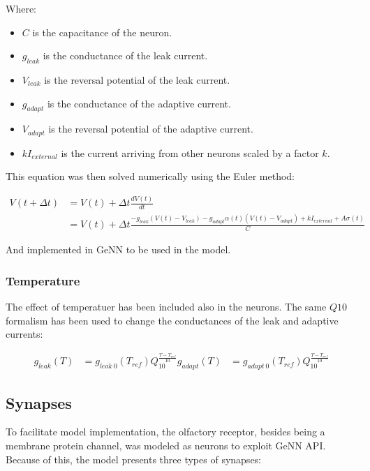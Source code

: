   Where:

  \begin{multicols}{2}
    \begin{itemize}
      \item $C$ is the capacitance of the neuron.
      \item $g_{leak}$ is the conductance of the leak current.
      \item $V_{leak}$ is the reversal potential of the leak current.
      \item $g_{adapt}$ is the conductance of the adaptive current.
      \item $V_{adapt}$ is the reversal potential of the adaptive current.
      \item $k I_{external}$ is the current arriving from other neurons scaled by a factor $k$.
    \end{itemize}
  \end{multicols}

  This equation was then solved numerically using the Euler method:

  \begin{align}
    V(t + \Delta t) &= V(t) + \Delta t\frac{dV(t)}{dt}\\
                    &= V(t) + \Delta t\frac{-g_{leak}(V(t)-V_{leak}) - g_{adapt}\alpha(t)(V(t) - V_{adapt}) + k I_{external} + A\sigma(t)}{C}
  \end{align}

  And implemented in GeNN to be used in the model.

    \subsubsection{Temperature}
    The effect of temperatuer has been included also in the neurons.
    The same $Q10$ formalism has been used to change the conductances of the leak and adaptive currents:

    \begin{align}
      g_{leak}(T) &= g_{leak\ 0}(T_{ref})Q_{10}^{\frac{T - T_{ref}}{10}}
      g_{adapt}(T) &= g_{adapt\ 0}(T_{ref})Q_{10}^{\frac{T - T_{ref}}{10}}
    \end{align}

  \subsection{Synapses}
  To facilitate model implementation, the olfactory receptor, besides being a membrane protein channel, was modeled as neurons to exploit GeNN API.
  Because of this, the model presents three types of synapses:

